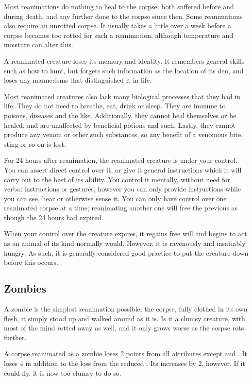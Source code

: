 Most reanimations do nothing to heal {\damage} to the corpse: both {\damage} suffered before and during death, and any further {\damage} done to the corpse since then.
Some reanimations also require an unrotted corpse.
It usually takes a little over a week before a corpse becomes too rotted for such a reanimation, although temperature and moisture can alter this.

A reanimated creature loses its memory and identity.
It remembers general skills such as how to hunt, but forgets such information as the location of its den, and loses any mannerisms that distinguished it in life.

Most reanimated creatures also lack many biological processes that they had in life.
They do not need to breathe, eat, drink or sleep.
They are immune to poisons, diseases and the like.
Additionally, they cannot heal themselves or be healed, and are unaffected by beneficial potions and such.
Lastly, they cannot produce any venom or other such substances, so any benefit of a venomous bite, sting or so on is lost.

For 24 hours after reanimation, the reanimated creature is under your control.
You can assert direct control over it, or give it general instructions which it will carry out to the best of its ability.
You control it mentally, without need for verbal instructions or gestures, however you can only provide instructions while you can see, hear or otherwise sense it.
You can only have control over one reanimated corpse at a time; reanimating another one will free the previous as though the 24 hours had expired.

When your control over the creature expires, it regains free will and begins to act as an animal of its kind normally would.
However, it is ravenously and insatiably hungry.
As such, it is generally considered good practice to put the creature down before this occurs.

\subsection{Zombies}

A zombie is the simplest reanimation possible; the corpse, fully clothed in its own flesh, it simply stood up and walked around as it is.
Is it a clumsy creature, with most of the mind rotted away as well, and it only grows worse as the corpse rots further.

A corpse reanimated as a zombie loses 2 points from all attributes except  and .
It loses 4  in addition to the loss from the reduced .
Its  increases by 2, however.
If it could fly, it is now too clumsy to do so.

